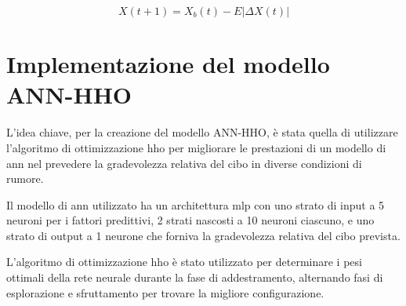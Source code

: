 \begin{equation}
      X(t+1) = X_{b}(t) - E|\Delta X(t)|
\end{equation}

\section{Implementazione del modello ANN-HHO}
\noindent

L'idea chiave, per la creazione del modello ANN-HHO, è stata quella di utilizzare l'algoritmo di ottimizzazione \gls{hho} per migliorare le prestazioni di un modello di \gls{ann} nel prevedere la gradevolezza relativa del cibo in  diverse condizioni di rumore.

Il modello di \gls{ann} utilizzato ha un architettura \gls{mlp} con uno strato di input a 5 neuroni per i fattori predittivi, 2 strati nascosti a 10 neuroni ciascuno, e uno strato di output a 1 neurone che forniva la gradevolezza relativa del cibo prevista. 

L'algoritmo di ottimizzazione \gls{hho} è stato utilizzato per determinare i pesi ottimali della rete neurale durante la fase di addestramento, alternando fasi di esplorazione e sfruttamento per trovare la migliore configurazione.

